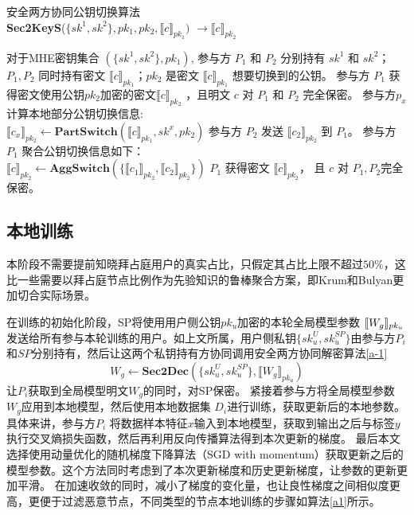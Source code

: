 \begin{algorithm}[htbp]
	\caption{安全两方协同公钥切换算法\\ \textbf{Sec2KeyS}($\{sk^1, sk^2\}, pk_1, pk_2, \llbracket c\rrbracket_{pk_1})$ $\rightarrow \llbracket c\rrbracket_{pk_2}$}
	\label{a-2}
	\begin{algorithmic}[1]
		\REQUIRE 对于MHE密钥集合 $(\{sk^1, sk^2\}, pk_1)$, 参与方 $P_1$ 和 $P_2$ 分别持有 $sk^1$ 和 $sk^2$；$P_1, P_2$ 同时持有密文 $\llbracket c\rrbracket_{pk_1}$；$pk_2$ 是密文 $\llbracket c\rrbracket_{pk_1}$ 想要切换到的公钥。
		\ENSURE 参与方 $P_1$ 获得密文使用公钥$pk_2$加密的密文$\llbracket c\rrbracket_{pk_2}$ ，且明文 $c$ 对 $P_1$ 和 $P_2$ 完全保密。
		\STATE  参与方$p_x$ 计算本地部分公钥切换信息:\\ $\llbracket c_x\rrbracket_{pk_2} \leftarrow \textbf{PartSwitch}(\llbracket c\rrbracket_{pk_1}, sk^x, pk_2)$
		\ENDFOR
		\STATE 参与方 $P_2$ 发送 $\llbracket c_2\rrbracket_{pk_2}$ 到 $P_1$。
		\STATE 参与方 $P_1$ 聚合公钥切换信息如下：\\ $\llbracket c\rrbracket_{pk_2} \leftarrow \textbf{AggSwitch}(\{\llbracket c_1\rrbracket_{pk_2}, \llbracket c_2\rrbracket_{pk_2} \})$
		\RETURN $ P_1 $ 获得密文 $\llbracket c\rrbracket_{pk_2}$， 且 $c$ 对 $ P_1, P_2 $完全保密。
	\end{algorithmic}
\end{algorithm}

\subsection{本地训练}
本阶段不需要提前知晓拜占庭用户的真实占比，只假定其占比上限不超过$50\%$，这比一些需要以拜占庭节点比例作为先验知识的鲁棒聚合方案，即Krum\cite{blanchard2017machine}和Bulyan\cite{guerraoui2018hidden}更加切合实际场景。

在训练的初始化阶段，SP将使用用户侧公钥$ pk_u $加密的本轮全局模型参数
$ \ctx[pk_u]{W_g} $发送给所有参与本轮训练的用户。如上文所属，用户侧私钥$\{sk_u^{U}, sk_u^{SP}\}$由参与方$P_i$和$SP$分别持有，然后让这两个私钥持有方协同调用安全两方协同解密算法\ref{a-1}
\begin{equation}\label{dec}
	W_g \leftarrow \textbf{Sec2Dec}(\{sk_u^U, sk_u^{SP}\}, \llbracket W_g\rrbracket_{pk_u})
\end{equation}
让$ P_i $获取到全局模型明文$ W_g $的同时，对SP保密。
紧接着参与方将全局模型参数$ W_g $应用到本地模型，然后使用本地数据集
$ D_i $进行训练，获取更新后的本地参数。具体来讲，参与方$P_i$ 将数据样本特征$x$输入到本地模型，获取到输出之后与标签$ y $执行交叉熵损失函数，然后再利用反向传播算法得到本次更新的梯度。
最后本文选择使用动量优化的随机梯度下降算法（SGD with momentum）获取更新之后的模型参数。这个方法同时考虑到了本次更新梯度和历史更新梯度，让参数的更新更加平滑。
在加速收敛的同时，减小了梯度的变化量，也让良性梯度之间相似度更高，更便于过滤恶意节点，不同类型的节点本地训练的步骤如算法\ref{a1}所示。

